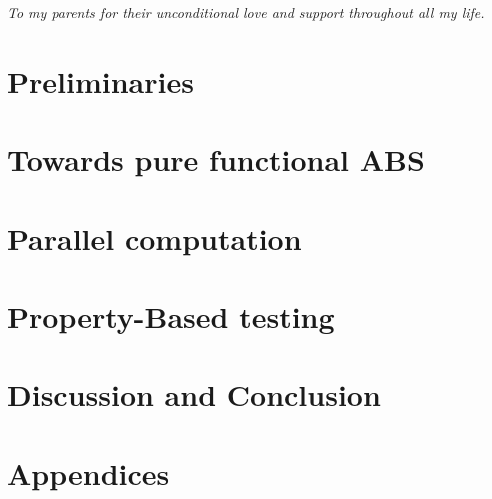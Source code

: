 \documentclass[oneside]{book}
\begin{document}
\clearpage
\tableofcontents
\clearpage
\textit{To my parents for their unconditional love and support throughout all my life.}
\clearpage



\epigraphhead[450]{}
\part{Preliminaries}







\epigraphhead[450]{}
\part{Towards pure functional ABS}






\epigraphhead[450]{}
\part{Parallel computation}


\epigraphhead[450]{}
\part{Property-Based testing}


\epigraphhead[450]{}
\part{Discussion and Conclusion}


\renewcommand\bibname{References}




\epigraphhead[450]{}
\part{Appendices}

\end{document}
